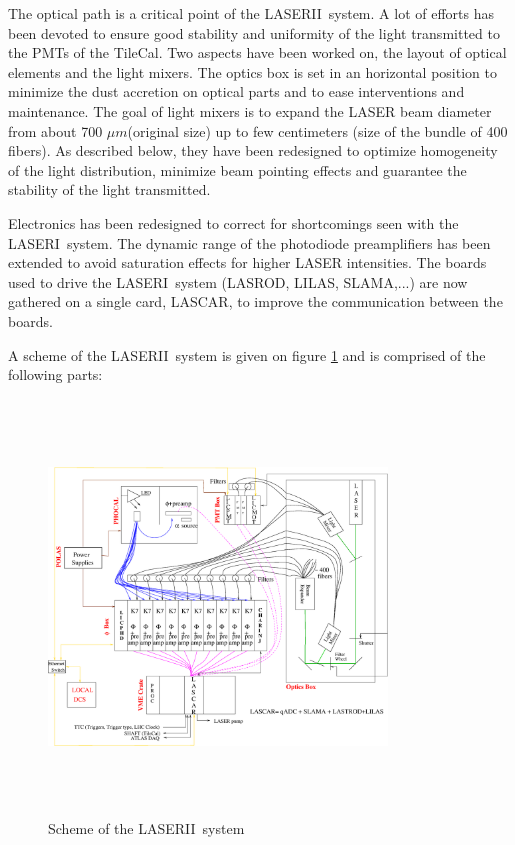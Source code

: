 \documentclass[UKenglish,texlive=2013]{\ATLASLATEXPATH atlasdoc}
\newcommand{\lasi}{{\sc LASERI}}
\newcommand{\lasii}{{\sc LASERII}}
\newcommand{\lascar}{{\sc LASCAR}}
\newcommand{\mum}{$\mu m$}
\begin{document}
\par
The optical path is a critical point of the \lasii~system. A lot of efforts has been devoted to ensure good stability and uniformity of the light transmitted to the PMTs of the TileCal. Two aspects have been worked on, the layout of optical elements and the light mixers. The optics box is set in an horizontal position to minimize the dust accretion on optical parts and to ease interventions and maintenance. The goal of light mixers is to expand the LASER beam diameter from about 700 \mum (original size) up to few centimeters (size of the bundle of 400 fibers). As described below, they have been redesigned to optimize homogeneity of the light distribution, minimize beam pointing effects and  guarantee the stability of the light transmitted.
\par
Electronics has been redesigned to correct for shortcomings seen with the \lasi~system. The dynamic range of the photodiode preamplifiers has been extended to avoid saturation effects for higher LASER intensities. The boards used to drive the \lasi~system (LASROD, LILAS, SLAMA,...) are now gathered on a single card, \lascar, to improve the communication between the boards.
\par
A scheme of the \lasii~system is given on figure \ref{fig:laserscheme} and is comprised of the following parts:
\begin{figure}[htbp]
\centering
\includegraphics[width=9cm,height=11cm]{figures/LaserII_latest_latest.eps}
\caption{Scheme of the \lasii~system}\label{fig:laserscheme}
\end{figure}
\end{document}
